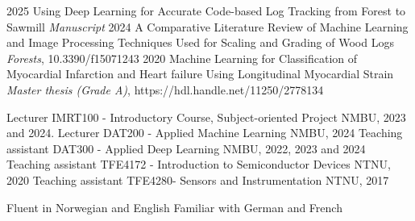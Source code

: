 

\begin{cvSmallExps}
    \cvSmallExp
        {2025} %
        {Using Deep Learning for Accurate Code-based Log Tracking from Forest to Sawmill} %
        {\textit{Manuscript}} %
    \cvSmallExp
        {2024} %
        {A Comparative Literature Review of Machine Learning and Image Processing Techniques Used for Scaling and Grading of Wood Logs} %
        {\textit{Forests}, 10.3390/f15071243} %
    \cvSmallExp
        {2020} %
        {Machine Learning for Classification of Myocardial Infarction and Heart failure Using Longitudinal Myocardial Strain} %
        {\textit{Master thesis (Grade A)}, https://hdl.handle.net/11250/2778134} %
\end{cvSmallExps}

\vspace{1em} %


\begin{cvSmallExps}
    \cvSmallExp
        {Lecturer} %
        {IMRT100 - Introductory Course, Subject-oriented Project} %
        {NMBU, 2023 and 2024.} %
    \cvSmallExp
        {Lecturer} %
        {DAT200 - Applied Machine Learning} %
        {NMBU, 2024} %
    \cvSmallExp
        {Teaching assistant} %
        {DAT300 - Applied Deep Learning} %
        {NMBU, 2022, 2023 and 2024} %
    \cvSmallExp
        {Teaching assistant} %
        {TFE4172 - Introduction to Semiconductor Devices} %
        {NTNU, 2020} %
    \cvSmallExp
        {Teaching assistant} %
        {TFE4280- Sensors and Instrumentation} %
        {NTNU, 2017} %
\end{cvSmallExps}

\vspace{1em} %


\begin{cvSmallExps}
    \cvSmallExp
        {Fluent in}
        {Norwegian and English}
        {} 
    \cvSmallExp
        {Familiar with}
        {German and French}
        {}
\end{cvSmallExps}

